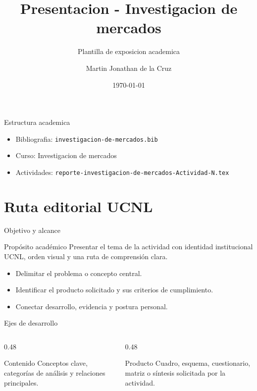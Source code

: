 ﻿\documentclass[spanish,aspectratio=169]{beamer}
\title{Presentacion - Investigacion de mercados}
\subtitle{Plantilla de exposicion academica}
\author{Martin Jonathan de la Cruz}
\institute{Universidad Ciudadana de Nuevo Leon}
\date{\today}
\begin{document}
\begin{frame}
  \titlepage
\end{frame}

\begin{frame}{Estructura academica}
  \begin{itemize}
    \item Bibliografia: \texttt{investigacion-de-mercados.bib}
    \item Curso: Investigacion de mercados
    \item Actividades: \texttt{reporte-investigacion-de-mercados-Actividad-N.tex}
  \end{itemize}
\end{frame}


\section{Ruta editorial UCNL}

\begin{frame}{Objetivo y alcance}
  \begin{block}{Propósito académico}
    Presentar el tema de la actividad con identidad institucional UCNL, orden visual y una ruta de comprensión clara.
  \end{block}
  \begin{itemize}
    \item Delimitar el problema o concepto central.
    \item Identificar el producto solicitado y sus criterios de cumplimiento.
    \item Conectar desarrollo, evidencia y postura personal.
  \end{itemize}
\end{frame}

\begin{frame}{Ejes de desarrollo}
  \begin{columns}[T,totalwidth=\textwidth]
    \begin{column}{0.48\textwidth}
      \begin{block}{Contenido}
        Conceptos clave, categorías de análisis y relaciones principales.
      \end{block}
    \end{column}
    \begin{column}{0.48\textwidth}
      \begin{block}{Producto}
        Cuadro, esquema, cuestionario, matriz o síntesis solicitada por la actividad.
      \end{block}
    \end{column}
  \end{columns}
\end{frame}
\end{document}
